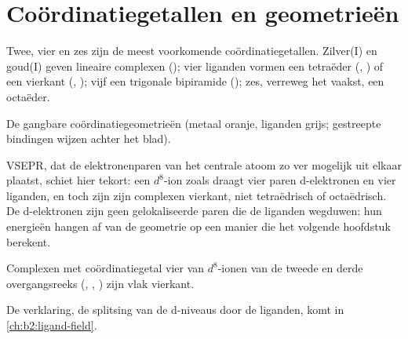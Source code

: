 \section{Coördinatiegetallen en geometrieën}

Twee, vier en zes zijn de meest voorkomende coördinatiegetallen. Zilver(I) en goud(I) geven
lineaire complexen (\ce{[Ag(NH3)2]+}); vier liganden vormen een tetraëder
(, ) of een vierkant (, );
vijf een trigonale bipiramide (); zes, verreweg het vaakst, een
octaëder.

\begin{omfigure}

{\small De gangbare coördinatiegeometrieën (metaal oranje, liganden grijs; gestreepte
bindingen wijzen achter het blad).}
\end{omfigure}

VSEPR, dat de elektronenparen van het centrale atoom zo ver mogelijk uit elkaar plaatst,
schiet hier tekort: een $d^8$-ion zoals  draagt vier paren d-elektronen en vier
liganden, en toch zijn zijn complexen vierkant, niet tetraëdrisch of octaëdrisch. De
d-elektronen zijn geen gelokaliseerde paren die de liganden wegduwen: hun energieën hangen
af van de geometrie op een manier die het volgende hoofdstuk berekent.

\begin{proposition}\label{prop:b2:coordination-complexes:square-planar}
Complexen met coördinatiegetal vier van $d^8$-ionen van de tweede en derde overgangsreeks
(, , ) zijn vlak vierkant.
\end{proposition}

\admitted

De verklaring, de splitsing van de d-niveaus door de liganden, komt in
\cref{ch:b2:ligand-field}.

